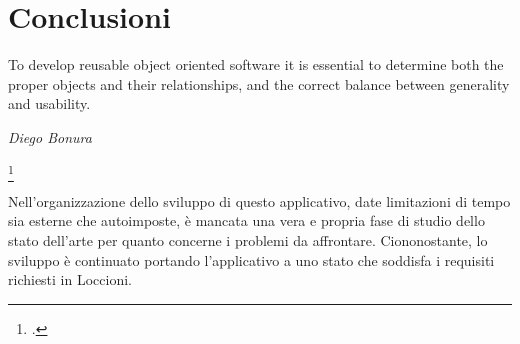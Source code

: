 






\chapter{Conclusioni}
\setlength{\epigraphwidth}{0.6\textwidth}
\epigraph{To develop reusable object oriented software it is essential to
determine both the proper objects and their relationships,
and the correct balance between generality and usability.}{\textit{Diego Bonura}\footnotemark }
\footcitetext{DBLP:conf/seke/BonuraCM02}

Nell'organizzazione dello sviluppo di questo applicativo, date limitazioni di tempo sia esterne che autoimposte, è mancata una vera e propria fase di studio dello stato dell'arte per quanto concerne i problemi da affrontare.
Ciononostante, lo sviluppo è continuato portando l'applicativo a uno stato che soddisfa i requisiti richiesti in Loccioni. 

